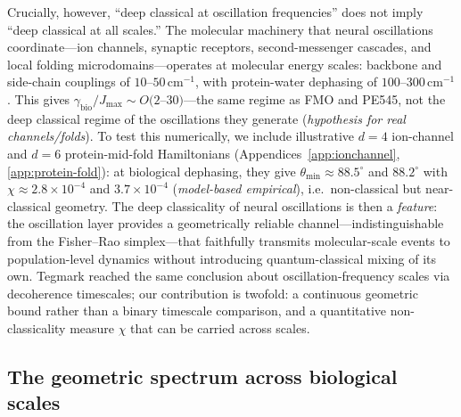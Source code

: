 \documentclass[12pt,a4paper]{article}
\theoremstyle{definition}
\theoremstyle{remark}
\begin{document}
Crucially, however, ``deep classical at oscillation frequencies'' does not imply ``deep classical at all scales.'' The molecular machinery that neural oscillations coordinate---ion channels, synaptic receptors, second-messenger cascades, and local folding microdomains---operates at molecular energy scales: backbone and side-chain couplings of $10$--$50$\,cm$^{-1}$, with protein-water dephasing of $100$--$300$\,cm$^{-1}$ \cite{hamm2011concepts}. This gives $\gamma_{\mathrm{bio}}/J_{\max} \sim O(2$--$30)$---the same regime as FMO and PE545, not the deep classical regime of the oscillations they generate (\emph{hypothesis for real channels/folds}). To test this numerically, we include illustrative $d=4$ ion-channel and $d=6$ protein-mid-fold Hamiltonians (Appendices~\ref{app:ionchannel}, \ref{app:protein-fold}): at biological dephasing, they give $\theta_{\min} \approx 88.5^\circ$ and $88.2^\circ$ with $\chi \approx 2.8\times10^{-4}$ and $3.7\times10^{-4}$ (\emph{model-based empirical}), i.e.\ non-classical but near-classical geometry. The deep classicality of neural oscillations is then a \emph{feature}: the oscillation layer provides a geometrically reliable channel---indistinguishable from the Fisher--Rao simplex---that faithfully transmits molecular-scale events to population-level dynamics without introducing quantum-classical mixing of its own. Tegmark \cite{tegmark2000importance} reached the same conclusion about oscillation-frequency scales via decoherence timescales; our contribution is twofold: a continuous geometric bound rather than a binary timescale comparison, and a quantitative non-classicality measure $\chi$ that can be carried across scales.

\subsection{The geometric spectrum across biological scales}
\label{sec:cross-scale}
\end{document}
